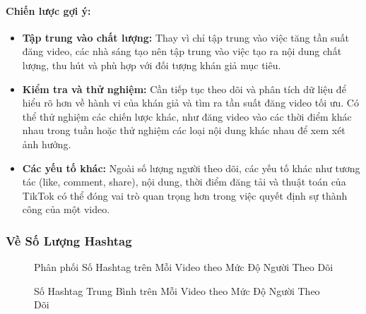 \paragraph{Chiến lược gợi ý:}
\begin{itemize}
    \item \textbf{Tập trung vào chất lượng:} Thay vì chỉ tập trung vào việc tăng tần suất đăng video, các nhà sáng tạo nên tập trung vào việc tạo ra nội dung chất lượng, thu hút và phù hợp với đối tượng khán giả mục tiêu.
    
    \item \textbf{Kiểm tra và thử nghiệm:} Cần tiếp tục theo dõi và phân tích dữ liệu để hiểu rõ hơn về hành vi của khán giả và tìm ra tần suất đăng video tối ưu. Có thể thử nghiệm các chiến lược khác, như đăng video vào các thời điểm khác nhau trong tuần hoặc thử nghiệm các loại nội dung khác nhau để xem xét ảnh hưởng.
    
    \item \textbf{Các yếu tố khác:} Ngoài số lượng người theo dõi, các yếu tố khác như tương tác (like, comment, share), nội dung, thời điểm đăng tải và thuật toán của TikTok có thể đóng vai trò quan trọng hơn trong việc quyết định sự thành công của một video.
\end{itemize}

\subsubsection{Về Số Lượng Hashtag}

\begin{figure}[H]
    \centering
    \caption{Phân phối Số Hashtag trên Mỗi Video theo Mức Độ Người Theo Dõi}
    \label{fig:so_hashtag_phan_phoi}
\end{figure}

\begin{figure}[H]
    \centering
    \caption{Số Hashtag Trung Bình trên Mỗi Video theo Mức Độ Người Theo Dõi}
    \label{fig:so_hashtag_trung_binh}
\end{figure}

